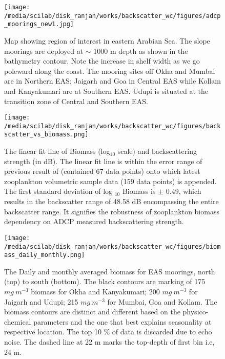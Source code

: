 \documentclass{article}
\begin{document}
\newpage
\begin{figure}[htbp]
	\centering
	\texttt{[image: /media/scilab/disk\_ranjan/works/backscatter\_wc/figures/adcp\_moorings\_new1.jpg]} 
	\captionsetup{justification=justified,font=footnotesize,skip=0.05\baselineskip,width=0.8\textwidth}
	\caption{Map showing region of interest in eastern Arabian Sea. The slope moorings are
		deployed at $\sim$ 1000 m depth as shown in the bathymetry contour. Note the increase in shelf width as we go poleward along the coast. The mooring sites off Okha and Mumbai are in Northern EAS; Jaigarh and Goa in Central EAS while Kollam and Kanyakumari are at Southern EAS. Udupi is situated at the transition zone of Central and Southern EAS.}
	\label{fig:fig1}
\end{figure}

\newpage
\begin{figure}[htbp]
	\centering
	\texttt{[image: /media/scilab/disk\_ranjan/works/backscatter\_wc/figures/backscatter\_vs\_biomass.png]} 
	\captionsetup{justification=justified,font=footnotesize,skip=0.05\baselineskip,width=0.8\textwidth}
	\caption{The linear fit line of Biomass (log$_10$ scale) and backscattering strength (in dB). The linear fit line is within the error range of previous result of \citep{aparna2022seasonal} (contained 67 data points) onto which latest zooplankton volumetric sample data (159 data points) is appended. The first standard deviation of log $_10$ Biomass is $\pm$ 0.49, which results in the backscatter range of 48.58 dB encompassing the entire backscatter range. It signifies the robustness of zooplankton biomass dependency on ADCP measured backscattering strength.}
	\label{fig:fig2}
\end{figure}


\newpage


\begin{figure}[htbp]
	\centering
	\texttt{[image: /media/scilab/disk\_ranjan/works/backscatter\_wc/figures/biomass\_daily\_monthly.png]} 
	\captionsetup{justification=justified,font=footnotesize,skip=0.05\baselineskip,width=\textwidth}
	\caption{The Daily and monthly averaged biomass for EAS moorings, north (top) to south (bottom). The black contours are marking of 175 $mg\ m^{-3}$ biomass for Okha and Kanyakumari; 200 $mg\ m^{-3}$ for Jaigarh and Udupi; 215 $mg\ m^{-3}$  for Mumbai, Goa and Kollam. The biomass contours are distinct and different based on the physico-chemical parameters and the one that best explains seasonality at respective location.  The top 10 \% of data is discarded due to echo noise. The dashed line at 22 m marks the top-depth of first bin i.e, 24 m.}
	\label{fig:fig3}
\end{figure}
\end{document}
